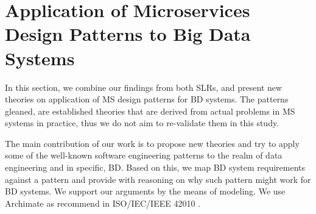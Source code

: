 \documentclass[a4paper,11pt,article,oneside]{memoir}
\begin{document}

        
        

        

        
        

        

             
        

        



\chapter{Application of Microservices Design Patterns to Big Data Systems}


In this section, we combine our findings from both SLRs, and present new theories on application of MS design patterns for BD systems. The patterns gleaned, are established theories that are derived from actual problems in MS systems in practice, thus we do not aim to re-validate them in this study. 

The main contribution of our work is to propose new theories and try to apply some of the well-known software engineering patterns to the realm of data engineering and in specific, BD. Based on this, we map BD system requirements against a pattern and provide with reasoning on why such pattern might work for BD systems. We support our arguments by the means of modeling. We use Archimate \cite{lankhorst2013language} as recommend in ISO/IEC/IEEE 42010 \cite{Chaabane}. 

\end{document}
